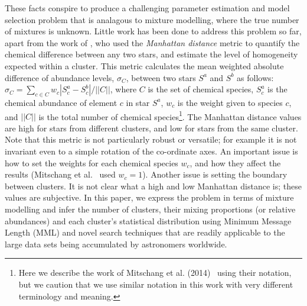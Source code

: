 \documentclass{elsarticle}
\begin{document}
These facts conspire to produce a challenging parameter estimation and model
selection problem that is analagous to mixture modelling, where the true number 
of mixtures is unknown. Little work has been done to address this problem so 
far, apart from the work of \cite{mitschang2014quantitative}, who used the 
\emph{Manhattan distance} metric to quantify the chemical difference between 
any two stars, and estimate the level of homogeneity expected within a cluster. 
This metric calculates the mean weighted absolute difference of abundance 
levels, $\sigma_C$, between two stars $S^a$ and $S^b$ as follows:
$\sigma_C = \sum_{c \in C}w_c|S^a_c-S^b_c|/||C||$, where $C$ is the set of 
chemical species, $S^a_c$ is the chemical abundance of element $c$ in star $
S^a$, $w_c$ is the weight given to species $c$, and $||C||$ is the total 
number of chemical species\footnote{Here we describe the work of Mitschang et
al. (2014)~\cite{mitschang2014quantitative} using their notation, but we 
caution that we use similar notation in this work with very different 
terminology and meaning.}. The Manhattan distance values are high for stars 
from different clusters, and low for stars from the same cluster. Note that 
this metric is not particularly robust or versatile; for example it is not 
invariant even to a simple rotation of the co-ordinate axes.
An important issue is how to set the weights for each chemical species $w_c$, 
and how they affect the results (Mitschang et al.~\cite{mitschang2014quantitative} 
used $w_c=1$). Another issue is setting the boundary between clusters. It is 
not clear what a high and low Manhattan distance is; these values are subjective. 
In this paper, we express the problem in terms of mixture modelling and infer 
the number of clusters, their mixing proportions (or relative abundances) and 
each cluster's statistical distribution using Minimum Message Length (MML) and 
novel search techniques that are readily applicable to the large data sets
being accumulated by astronomers worldwide.


\end{document}
